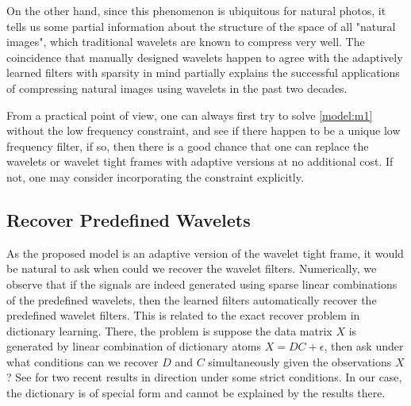 \documentclass[a4paper]{article}
\begin{document}
On the other hand, since this phenomenon is ubiquitous for natural photos, it tells us some partial information about the structure of the space of all "natural images", which traditional wavelets are known to compress very well. The coincidence that manually designed wavelets happen to agree with the adaptively learned filters with sparsity in mind partially explains the successful applications of compressing natural images using wavelets in the past two decades.

From a practical point of view, one can always first try to solve \eqref{model:m1} without the low frequency constraint, and see if there happen to be a unique low frequency filter, if so, then there is a good chance that one can replace the wavelets or wavelet tight frames with adaptive versions at no additional cost. If not, one may consider incorporating the constraint explicitly.

\subsection{Recover Predefined Wavelets}
As the proposed model is an adaptive version of the wavelet tight frame, it would be natural to ask when could we recover the wavelet filters. Numerically, we observe that if the signals are indeed generated using sparse linear combinations of the predefined wavelets, then the learned filters automatically recover the predefined wavelet filters. This is related to the exact recover problem in dictionary learning. There, the problem is suppose the data matrix $X$ is generated by linear combination of dictionary atoms $X=DC+\epsilon$, then ask under what conditions can we recover $D$ and $C$ simultaneously given the observations $X$? See \cite{spielman2013exact,arora2013new} for two recent results in direction under some strict conditions. In our case, the dictionary is of special form and cannot be explained by the results there.
\end{document}
